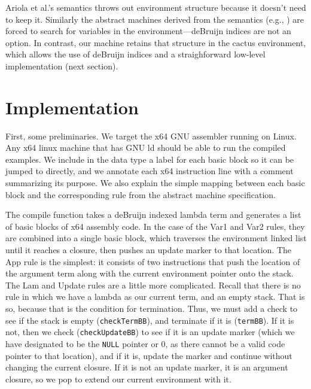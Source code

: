 \documentclass[preprint]{sigplanconf}
\begin{document}
Ariola et al.'s semantics throws out environment structure because
it doesn't need to keep it. Similarly the abstract machines derived from the
semantics (e.g., \cite{garcia2009lazy}) are forced to search for variables in the
environment---deBruijn indices are not an option. In contrast, our
machine retains that
structure in the cactus environment, which allows the use of deBruijn
indices and a straighforward low-level
implementation (next section).

\section{Implementation}\label{sec:impl}


First, some preliminaries. We target the x64 GNU assembler running on
Linux. Any x64 linux machine that has GNU ld should be able to run the
compiled examples.  We include in the data type a label for each basic
block so it can be jumped to directly, and we annotate each x64
instruction line with a comment summarizing its purpose.  We also
explain the simple mapping between each basic block and the
corresponding rule from the abstract machine specification.

The compile function takes a deBruijn indexed lambda term and
generates a list of basic blocks of x64 assembly code. In the case of the Var1
and Var2 rules, they are combined into a single basic block, which traverses the
environment linked list until it reaches a closure, then pushes an update marker
to that location. The App rule is the simplest: it consists of two instructions
that push the location of the argument term along with the current environment
pointer onto the stack. The Lam and Update rules are a little more complicated.
Recall that there is no rule in which we have a lambda as our current term, and
an empty stack. That is so, because that is the condition for termination. Thus, we
must add a check to see if the stack is empty (\texttt{checkTermBB}), and terminate if it
is (\texttt{termBB}). If it is not, then we check (\texttt{checkUpdateBB})
to see if it is an update marker (which
we have designated to be the \texttt{NULL} pointer or 0, as there cannot be a valid code
pointer to that location), and if it is,
update the marker and continue without changing the current closure. If it is
not an update marker, it is an argument closure, so we pop to extend our current
environment with it. 
\end{document}
